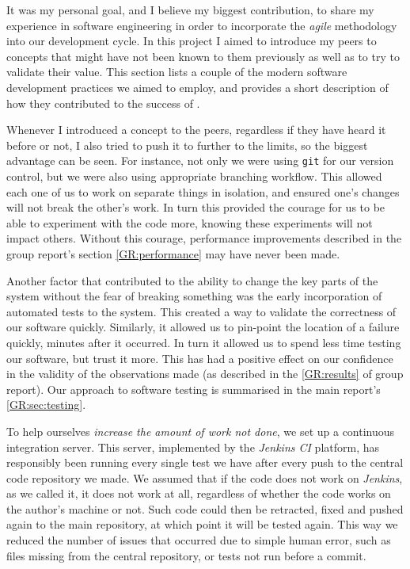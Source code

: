 It was my personal goal, and I believe my biggest contribution, to share my experience in software engineering in order to incorporate the \emph{agile} methodology into our development cycle. 
In this project I aimed to introduce my peers to concepts that might have not been known to them previously as well as to try to validate their value. 
This section lists a couple of the modern software development practices we aimed to employ, and provides a short description of how they contributed to the success of \means{}.

Whenever I introduced a concept to the peers, regardless if they have heard it before or not, I also tried to push it to further to the limits, so the biggest advantage can be seen. 
For instance, not only we were using \verb"git"\cite{git} for our version control, but we were also using appropriate branching workflow. 
This allowed each one of us to work on separate things in isolation, and ensured one's changes will not break the other's work. 
In turn this provided the courage for us to be able to experiment with the code more, knowing these experiments will not impact others.
Without this courage, performance improvements described in the group report's section \autoref*{GR:performance} may have never been made.

Another factor that contributed to the ability to change the key parts of the system without the fear of breaking something was the early incorporation of automated tests to the system. 
This created a way to validate the correctness of our software quickly.
Similarly, it allowed us to pin-point the location of a failure quickly, minutes after it occurred.
In turn it allowed us to spend less time testing our software, but trust it more.
This has had a positive effect on our confidence in the validity of the observations made (as described in the \autoref*{GR:results} of group report). Our approach to software testing is summarised in the main report's \autoref*{GR:sec:testing}.

To help ourselves \emph{increase the amount of work not done}, we set up a continuous integration server.
This server, implemented by the \emph{Jenkins CI} platform\cite{_jenkins_????}, has responsibly been running every single test we have after every push to the central code repository we made. 
We assumed that if the code does not work on \emph{Jenkins}, as we called it, it does not work at all, regardless of whether the code works on the author's machine or not. 
Such code could then be retracted, fixed and pushed again to the main repository, at which point it will be tested again. 
This way we reduced the number of issues that occurred due to simple human error, such as files missing from the central repository, or tests not run before a commit.

